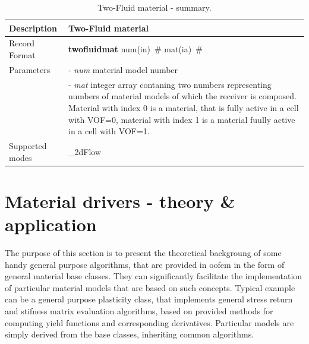 \documentclass[epsf,a4paper]{article}
\newcommand{\descitem}[1]{{\noindent \bf #1}}
\newcommand{\elemparam}[2]{{{#1\tiny (#2)}~\#}}
\newcommand{\param}[1]{{\it #1}}
\begin{document}
\begin{table}[h]                                                                
\begin{tabular}{|l|p{9cm}|}                                                      
\hline                                                                          
Description & Two-Fluid material\\
\hline                                                                          
Record Format & \descitem{twofluidmat} \elemparam{num}{in}
\elemparam{mat}{ia}\\
Parameters &- \param{num} material model number\\
&- \param{mat} integer array contaning two numbers representing
numbers of material models of which the receiver is composed. Material
with index 0 is a material, that is fully active in a cell with VOF=0,
material with index 1 is a material fuully active in a cell with VOF=1.\\
Supported modes& \_2dFlow\\
\hline
\end{tabular}                                                                   
\caption{Two-Fluid material - summary.}                
\label{TwoFluidMaterial_table}                                                         
\end{table}                                                                     


\clearpage
\section{Material drivers - theory \& application}
The purpose of this section is to present the theoretical backgroung
of some handy general purpose algorithms, that are provided in oofem in the
form of general material base classes. They can significantly
facilitate the implementation of particular material models that are
based on such concepts. Typical example can be a general purpose
plasticity class, that implements general stress return and stifness
matrix evaluation algorithms, based on provided methods for computing
yield functions and corresponding derivatives. Particular
models are simply derived from the base classes, inheriting
common algorithms. 
\end{document}
